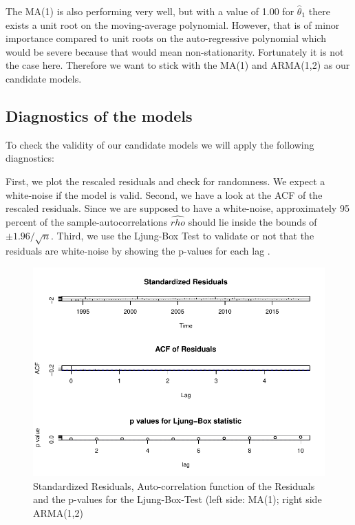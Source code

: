 \documentclass[11pt,a4paper]{article}
\begin{document}
The MA(1) is also performing very well, but with a value of 1.00 for $\hat{\theta}_1$ there exists a unit root on the moving-average polynomial.
However, that is of minor importance compared to unit roots on the auto-regressive polynomial \cite[p.~42--83]{bd02} which would be severe because that would mean non-stationarity.
Fortunately it is not the case here.
Therefore we want to stick with the MA(1) and ARMA(1,2) as our candidate models.


\subsection{Diagnostics of the models}
To check the validity of our candidate models we will apply the following diagnostics:

First, we plot the rescaled residuals and check for randomness.
We expect a white-noise if the model is valid.
Second, we have a look at the ACF of the rescaled residuals.
Since we are supposed to have a white-noise, approximately 95 percent of the sample-autocorrelations $\hat{rho}$ should lie inside the bounds of $\pm 1.96/\sqrt{n}$.
Third, we use the Ljung-Box Test \citep{LjungBox78} to validate or not that the residuals are white-noise by showing the p-values for each lag \cite[Lecture~11]{chevalier18}.

\begin{figure}
    \centering
    \includegraphics[width=1\textwidth]{ts_diag_ma_1}
    \caption{Standardized Residuals, Auto-correlation function of the Residuals and the p-values for the Ljung-Box-Test (left side: MA(1); right side ARMA(1,2)}
    \label{fig:ts_diag_ma_1}
\end{figure}
\end{document}
